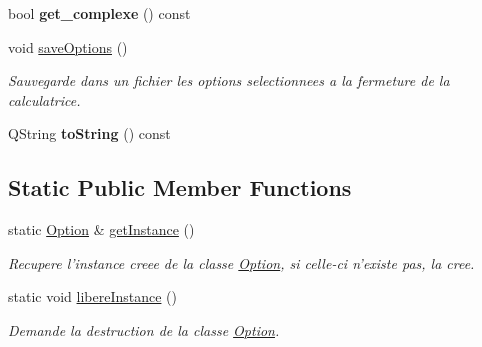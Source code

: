 \begin{DoxyCompactItemize}
\item 
\hypertarget{class_l_o21_1_1_option_a85c4404b22e2c62dd0186880a7384efc}{bool {\bfseries get\-\_\-complexe} () const }\label{class_l_o21_1_1_option_a85c4404b22e2c62dd0186880a7384efc}

\item 
\hypertarget{class_l_o21_1_1_option_a905539c6f4739562a34d6f897506a31b}{void \hyperlink{class_l_o21_1_1_option_a905539c6f4739562a34d6f897506a31b}{save\-Options} ()}\label{class_l_o21_1_1_option_a905539c6f4739562a34d6f897506a31b}

\begin{DoxyCompactList}\small\item\em \-Sauvegarde dans un fichier les options selectionnees a la fermeture de la calculatrice. \end{DoxyCompactList}\item 
\hypertarget{class_l_o21_1_1_option_a1ba94278e521d1674622bbdb363b0cb0}{\-Q\-String {\bfseries to\-String} () const }\label{class_l_o21_1_1_option_a1ba94278e521d1674622bbdb363b0cb0}

\end{DoxyCompactItemize}
\subsection*{\-Static \-Public \-Member \-Functions}
\begin{DoxyCompactItemize}
\item 
static \hyperlink{class_l_o21_1_1_option}{\-Option} \& \hyperlink{class_l_o21_1_1_option_a980e676bc500f07a7f9d7c73db24b1d8}{get\-Instance} ()
\begin{DoxyCompactList}\small\item\em \-Recupere l'instance creee de la classe \hyperlink{class_l_o21_1_1_option}{\-Option}, si celle-\/ci n'existe pas, la cree. \end{DoxyCompactList}\item 
\hypertarget{class_l_o21_1_1_option_a343e58ff25fc13b82d1775f08a8add4d}{static void \hyperlink{class_l_o21_1_1_option_a343e58ff25fc13b82d1775f08a8add4d}{libere\-Instance} ()}\label{class_l_o21_1_1_option_a343e58ff25fc13b82d1775f08a8add4d}

\begin{DoxyCompactList}\small\item\em \-Demande la destruction de la classe \hyperlink{class_l_o21_1_1_option}{\-Option}. \end{DoxyCompactList}\end{DoxyCompactItemize}


